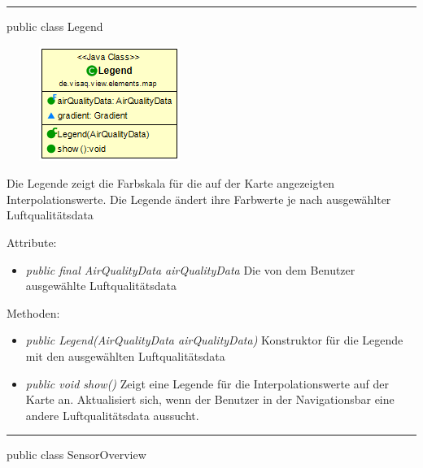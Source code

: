 

\rule{\textwidth}{0.4pt} 
public class Legend

\begin{minipage}{0.3\textwidth}
    \begin{figure}[H]
        \includegraphics[scale = 0.6]{media/frontend/view/de.view.elements.map/Legend_Class.png}
    \end{figure}
    \end{minipage} \hfill
    \begin{minipage}{0.6\textwidth}
Die Legende zeigt die Farbskala für die auf der Karte angezeigten Interpolationswerte. Die Legende ändert ihre Farbwerte je nach ausgewählter Luftqualitätsdata
\end{minipage}

Attribute:
\begin{itemize} 
    \item \emph{public final AirQualityData airQualityData} Die von dem Benutzer ausgewählte Luftqualitätsdata
\end{itemize} 
Methoden:
\begin{itemize}     
    \item \emph{public Legend(AirQualityData airQualityData)} Konstruktor für die Legende mit den ausgewählten Luftqualitätsdata
    \item \emph{public void show()} Zeigt eine Legende für die Interpolationswerte auf der Karte an. Aktualisiert sich, wenn der Benutzer in der Navigationsbar eine andere Luftqualitätsdata aussucht.
\end{itemize}

\rule{\textwidth}{0.4pt} 
public class SensorOverview

